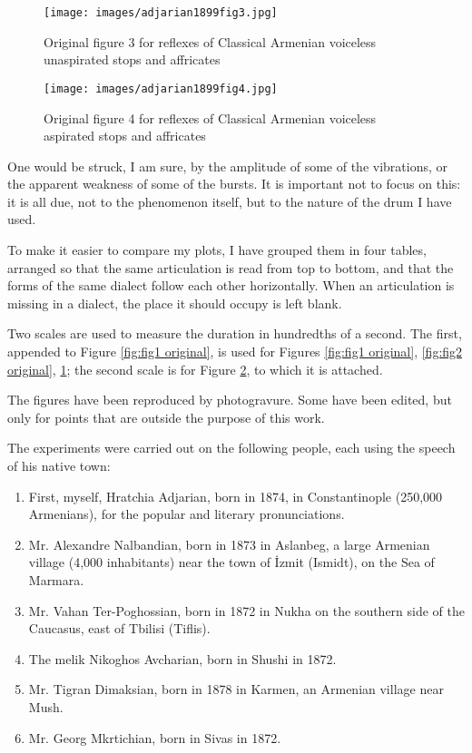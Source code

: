 \documentclass[output=paper]{langscibook}
\begin{document}
\begin{figure}
	\texttt{[image: images/adjarian1899fig3.jpg]}
	\caption{Original figure 3 for reflexes of Classical Armenian voiceless unaspirated stops and affricates}
	\label{fig:fig3 original}
\end{figure}


\begin{figure}
	\texttt{[image: images/adjarian1899fig4.jpg]}
	\caption{Original figure 4 for reflexes of Classical Armenian voiceless aspirated stops and affricates}
	\label{fig:fig4 original}
\end{figure}



One would be struck, I am sure, by the amplitude of some of the vibrations, or the apparent weakness of some of the bursts. It is important not to focus on this: it is all due, not to the phenomenon itself, but to the nature of the drum I have used.

To make it easier to compare my plots, I have grouped them in four tables, arranged so that the same articulation is read from top to bottom, and that the forms of the same dialect follow each other horizontally. When an articulation is missing in a dialect, the place it should occupy is left blank.

Two scales are used to measure the duration in hundredths of a second. The first, appended to Figure \ref{fig:fig1 original}, is used for Figures \ref{fig:fig1 original}, \ref{fig:fig2 original}, \ref{fig:fig3 original}; the second scale is for Figure \ref{fig:fig4 original}, to which it is attached.

The figures have been reproduced by photogravure. Some have been edited, but only for points that are outside the purpose of this work.

The experiments were carried out on the following people, each using the speech of his native town:

\begin{enumerate}
	\item First, myself, Hratchia Adjarian, born in 1874, in Constantinople (250,000 Armenians), for the popular and literary pronunciations.
	\item Mr. Alexandre Nalbandian, born in 1873  in Aslanbeg, a large Armenian village (4,000 inhabitants) near the town of İzmit (Ismidt), on the Sea of Marmara.
	\item Mr. Vahan Ter-Poghossian, born in 1872 in Nukha  on the southern side of the Caucasus, east of Tbilisi (Tiflis).
	\item The melik Nikoghos Avcharian, born in Shushi  in 1872.
	\item Mr. Tigran Dimaksian, born in 1878  in Karmen, an Armenian village near Mush.
	\item Mr. Georg Mkrtichian, born in Sivas in 1872.
\end{enumerate}
\end{document}
